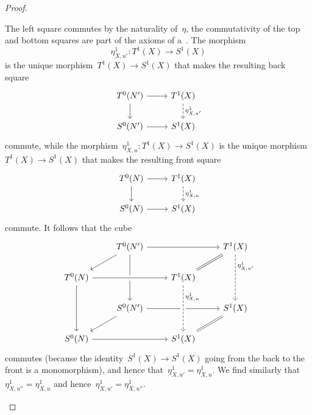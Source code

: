 \begin{proof}
\begin{enumerate}
\[      \]
      The left square commutes by the naturality of~$\eta$, the commutativity of the top and bottom squares are part of the axioms of a~{\deltafun}.
      The morphism
      \[
        \eta^1_{X,u'}
        \colon
        T^1(X)
        \to
        S^1(X)
      \]
      is the unique morphism~$T^1(X) \to S^1(X)$ that makes the resulting back square
      \[
        \begin{tikzcd}
            T^0(N')
            \arrow{r}
            \arrow{d}
          & T^1(X)
            \arrow[dashed]{d}{\eta^1_{X,u'}}
          \\
            S^0(N')
            \arrow{r}
          & S^1(X)
        \end{tikzcd}
      \]
      commute, while the morphism~$\eta^1_{X,u} \colon T^1(X) \to S^1(X)$ is the unique morphism~$T^1(X) \to S^1(X)$ that makes the resulting front square
      \[
        \begin{tikzcd}
            T^0(N)
            \arrow{r}
            \arrow{d}
          & T^1(X)
            \arrow[dashed]{d}{\eta^1_{X,u}}
          \\
            S^0(N)
            \arrow{r}
          & S^1(X)
        \end{tikzcd}
      \]
      commute.
      It follows that the cube
      \[
        \begin{tikzcd}
            {}
          & T^0(N')
            \arrow{rr}
            \arrow{dd}
            \arrow{dl}
          & {}
          & T^1(X)
            \arrow[equal]{dl}
            \arrow[dashed]{dd}[right, near start]{\eta^1_{X,u'}}
          \\
            T^0(N)
            \arrow{rr}
            \arrow{dd}
          & {}
          & T^1(X)
            \arrow[from=ll, crossing over]
          & {}
          \\
            {}
          & S^0(N')
            \arrow{rr}
            \arrow{dl}
          & {}
          & S^1(X)
            \arrow[equal]{dl}
          \\
            S^0(N)
            \arrow{rr}
          & {}
          & S^1(X)
            \arrow[from=uu, crossing over, dashed, right, "\eta^1_{X,u}", near start]
          & {}
        \end{tikzcd}
      \]
      commutes (because the identity~$S^1(X) \to S^1(X)$ going from the back to the front is a monomorphism), and hence that~$\eta^1_{X,u'} = \eta^1_{X,u}$.
      We find similarly that~$\eta^1_{X,u''} = \eta^1_{X,u}$ and hence~$\eta^1_{X,u'} = \eta^1_{X,u''}$.
      

\end{enumerate}
\end{proof}
